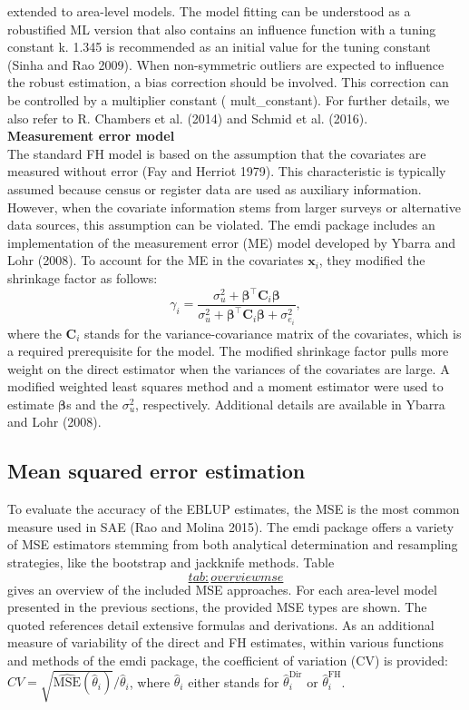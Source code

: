 extended to area-level models. The model fitting can be understood as a
robustified ML version that also contains an influence function with a
tuning constant k. 1.345 is recommended as an initial value for the
tuning constant (Sinha and Rao 2009). When non-symmetric outliers are expected
to influence the robust estimation, a bias correction should be
involved. This correction can be controlled by a multiplier constant (
mult\_constant). For further details, we also refer to R. Chambers et al. (2014) and
Schmid et al. (2016).\\
\textbf{Measurement error model}\\
The standard FH model is based on the assumption that the covariates are
measured without error (Fay and Herriot 1979). This characteristic is typically
assumed because census or register data are used as auxiliary
information. However, when the covariate information stems from larger
surveys or alternative data sources, this assumption can be violated.
The emdi package includes an implementation of the measurement error
(ME) model developed by Ybarra and Lohr (2008). To account for the ME in the
covariates \(\boldsymbol{x}_i\), they modified the shrinkage factor as
follows:
\[\gamma_i = \frac{\sigma_u^2 + \boldsymbol{\beta}^{\top} \boldsymbol{C}_i
    \boldsymbol{\beta}}{\sigma_u^2 + \boldsymbol{\beta}^{\top} \boldsymbol{C}_i
    \boldsymbol{\beta} + \sigma_{e_i}^2},\] where the \(\boldsymbol{C}_i\)
stands for the variance-covariance matrix of the covariates, which is a
required prerequisite for the model. The modified shrinkage factor pulls
more weight on the direct estimator when the variances of the covariates
are large. A modified weighted least squares method and a moment
estimator were used to estimate \(\boldsymbol{\beta}\)s and the
\(\sigma_u^2\), respectively. Additional details are available in
Ybarra and Lohr (2008).

\hypertarget{subsec:mseest}{%
\subsection{Mean squared error estimation}\label{subsec:mseest}}

To evaluate the accuracy of the EBLUP estimates, the MSE is the most
common measure used in SAE (Rao and Molina 2015). The emdi package offers a variety
of MSE estimators stemming from both analytical determination and
resampling strategies, like the bootstrap and jackknife methods.
Table~\protect\hyperlink{tab:overviewmse}{\[tab:overviewmse\]} gives an overview of the included MSE
approaches. For each area-level model presented in the previous
sections, the provided MSE types are shown. The quoted references detail
extensive formulas and derivations. As an additional measure of
variability of the direct and FH estimates, within various functions and
methods of the emdi package, the coefficient of variation (CV) is
provided:
\(CV = \sqrt{\widehat{\text{MSE}}(\hat{\theta}_{i})}/\hat{\theta}_{i}\),
where \(\hat{\theta}_{i}\) either stands for
\(\hat{\theta}_{i}^{\text{Dir}}\) or \(\hat{\theta}_{i}^{\text{FH}}\).

